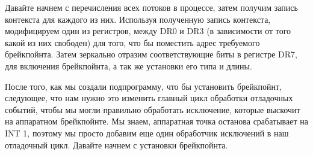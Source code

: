 \documentclass[12pt]{book}
\begin{document}
Давайте начнем с перечисления всех потоков в процессе, затем получим запись контекста для каждого из них. Используя полученную запись контекста, модифицируем один из регистров, между DR0 и DR3 (в зависимости от того какой из них свободен) для того, что бы поместить адрес требуемого брейкпойнта. Затем зеркально отразим соответствующие биты в регистре DR7, для включения брейкпойнта, а так же установки его типа и длины.

После того, как мы создали подпрограмму, что бы установить брейкпойнт, следующее, что нам нужно это изменить главный цикл обработки отладочных событий, чтобы мы могли правильно обработать исключение, которые выскочит на аппаратном брейкпойнте. Мы знаем, аппаратная точка останова срабатывает на INT 1, поэтому мы просто добавим еще один обработчик исключений в наш отладочный цикл. Давайте начнем с установки брейкпойнта.
\end{document}
